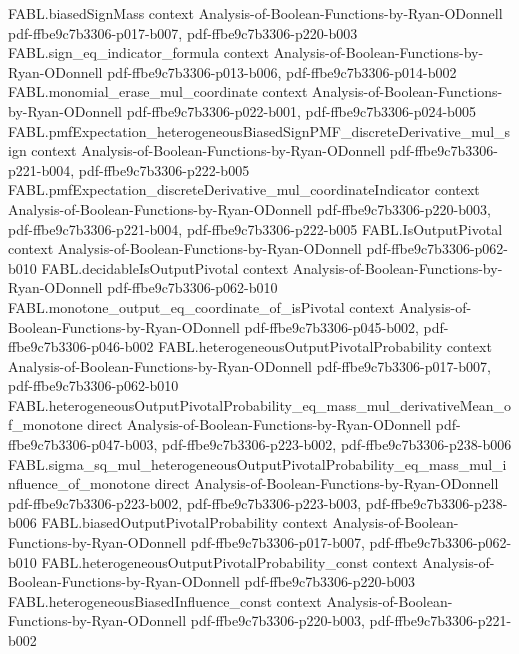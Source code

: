 \begin{theorem}
  {FABL.biasedSignMass}
  {context}
  {Analysis-of-Boolean-Functions-by-Ryan-ODonnell}
  {pdf-ffbe9c7b3306-p017-b007,
    pdf-ffbe9c7b3306-p220-b003}
\proofstep
  {FABL.sign_eq_indicator_formula}
  {context}
  {Analysis-of-Boolean-Functions-by-Ryan-ODonnell}
  {pdf-ffbe9c7b3306-p013-b006,
    pdf-ffbe9c7b3306-p014-b002}
\proofstep
  {FABL.monomial_erase_mul_coordinate}
  {context}
  {Analysis-of-Boolean-Functions-by-Ryan-ODonnell}
  {pdf-ffbe9c7b3306-p022-b001,
    pdf-ffbe9c7b3306-p024-b005}
\proofstep
  {FABL.pmfExpectation_heterogeneousBiasedSignPMF_discreteDerivative_mul_sign}
  {context}
  {Analysis-of-Boolean-Functions-by-Ryan-ODonnell}
  {pdf-ffbe9c7b3306-p221-b004,
    pdf-ffbe9c7b3306-p222-b005}
\proofstep
  {FABL.pmfExpectation_discreteDerivative_mul_coordinateIndicator}
  {context}
  {Analysis-of-Boolean-Functions-by-Ryan-ODonnell}
  {pdf-ffbe9c7b3306-p220-b003,
    pdf-ffbe9c7b3306-p221-b004,
    pdf-ffbe9c7b3306-p222-b005}
\proofstep
  {FABL.IsOutputPivotal}
  {context}
  {Analysis-of-Boolean-Functions-by-Ryan-ODonnell}
  {pdf-ffbe9c7b3306-p062-b010}
\proofstep
  {FABL.decidableIsOutputPivotal}
  {context}
  {Analysis-of-Boolean-Functions-by-Ryan-ODonnell}
  {pdf-ffbe9c7b3306-p062-b010}
\proofstep
  {FABL.monotone_output_eq_coordinate_of_isPivotal}
  {context}
  {Analysis-of-Boolean-Functions-by-Ryan-ODonnell}
  {pdf-ffbe9c7b3306-p045-b002,
    pdf-ffbe9c7b3306-p046-b002}
\proofstep
  {FABL.heterogeneousOutputPivotalProbability}
  {context}
  {Analysis-of-Boolean-Functions-by-Ryan-ODonnell}
  {pdf-ffbe9c7b3306-p017-b007,
    pdf-ffbe9c7b3306-p062-b010}
\proofstep
  {FABL.heterogeneousOutputPivotalProbability_eq_mass_mul_derivativeMean_of_monotone}
  {direct}
  {Analysis-of-Boolean-Functions-by-Ryan-ODonnell}
  {pdf-ffbe9c7b3306-p047-b003,
    pdf-ffbe9c7b3306-p223-b002,
    pdf-ffbe9c7b3306-p238-b006}
\proofstep
  {FABL.sigma_sq_mul_heterogeneousOutputPivotalProbability_eq_mass_mul_influence_of_monotone}
  {direct}
  {Analysis-of-Boolean-Functions-by-Ryan-ODonnell}
  {pdf-ffbe9c7b3306-p223-b002,
    pdf-ffbe9c7b3306-p223-b003,
    pdf-ffbe9c7b3306-p238-b006}
\proofstep
  {FABL.biasedOutputPivotalProbability}
  {context}
  {Analysis-of-Boolean-Functions-by-Ryan-ODonnell}
  {pdf-ffbe9c7b3306-p017-b007,
    pdf-ffbe9c7b3306-p062-b010}
\proofstep
  {FABL.heterogeneousOutputPivotalProbability_const}
  {context}
  {Analysis-of-Boolean-Functions-by-Ryan-ODonnell}
  {pdf-ffbe9c7b3306-p220-b003}
\proofstep
  {FABL.heterogeneousBiasedInfluence_const}
  {context}
  {Analysis-of-Boolean-Functions-by-Ryan-ODonnell}
  {pdf-ffbe9c7b3306-p220-b003,
    pdf-ffbe9c7b3306-p221-b002}

\end{theorem}
